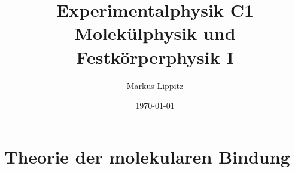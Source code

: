 \documentclass[notoc,nofonts,a4paper,twoside,nobib]{tufte-book}
\newcommand{\kapitelname}{Kapitel\ }
\begin{document}
  \tikzexternaldisable


\title{Experimentalphysik C1 \\ Molekülphysik und Festkörperphysik I}

\author{Markus Lippitz}
\date{\today}


\maketitle


%
\tableofcontents




\part{Theorie der molekularen Bindung}







%
%
%
%
%
%
%
%
%
%
%



%
%
%
%
%
%


\renewcommand{\kapitelname}{Anhang\ }


\appendix
\appendixpage



%
%
%

%

\printbibliography
\end{document}
